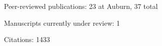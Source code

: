 \begin{veryTightItemize}
    \item Peer-reviewed publications: 23 at Auburn, 37 total
    \item Manuscripts currently under review: 1
    \item Citations: 1433
\end{veryTightItemize}
